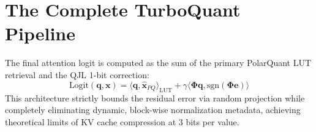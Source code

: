 \documentclass[11pt]{article}
\begin{document}
\section{The Complete TurboQuant Pipeline}
The final attention logit is computed as the sum of the primary PolarQuant LUT retrieval and the QJL 1-bit correction:
\begin{equation}
\text{Logit}(\mathbf{q}, \mathbf{x}) = \langle \mathbf{q}, \hat{\mathbf{x}}_{PQ} \rangle_{\text{LUT}} + \gamma \langle \mathbf{\Phi}\mathbf{q}, \text{sgn}(\mathbf{\Phi}\mathbf{e}) \rangle
\end{equation}
This architecture strictly bounds the residual error via random projection while completely eliminating dynamic, block-wise normalization metadata, achieving theoretical limits of KV cache compression at 3 bits per value.
\end{document}
